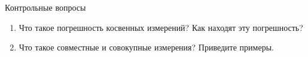 \documentclass[14pt,a4paper]{article}
\begin{document}
Контрольные вопросы \\
\begin{enumerate}
    \item Что такое погрешность косвенных измерений? Как находят эту погрешность?
    \item Что такое совместные и совокупные измерения? Приведите примеры.
\end{enumerate}

\end{document}
